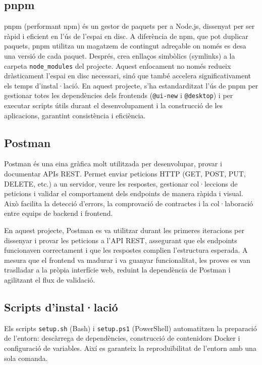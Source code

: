 \subsection*{pnpm}
pnpm (performant npm) és un gestor de paquets per a Node.js, dissenyat per ser ràpid i eficient en l'ús de l'espai en disc. A diferència de npm, que pot duplicar paquets, pnpm utilitza un magatzem de contingut adreçable on només es desa una versió de cada paquet. Després, crea enllaços simbòlics (symlinks) a la carpeta \texttt{node\_modules} del projecte. Aquest enfocament no només redueix dràsticament l'espai en disc necessari, sinó que també accelera significativament els temps d'instal·lació. En aquest projecte, s'ha estandarditzat l'ús de pnpm per gestionar totes les dependències dels frontends (\texttt{@ui-new} i \texttt{@desktop}) i per executar scripts útils durant el desenvolupament i la construcció de les aplicacions, garantint consistència i eficiència.

\subsection*{Postman}
Postman és una eina gràfica molt utilitzada per desenvolupar, provar i documentar APIs REST. Permet enviar peticions HTTP (GET, POST, PUT, DELETE, etc.) a un servidor, veure les respostes, gestionar col·leccions de peticions i validar el comportament dels endpoints de manera ràpida i visual. Això facilita la detecció d'errors, la comprovació de contractes i la col·laboració entre equips de backend i frontend.

En aquest projecte, Postman es va utilitzar durant les primeres iteracions per dissenyar i provar les peticions a l'API REST, assegurant que els endpoints funcionaven correctament i que les respostes complien l'estructura esperada. A mesura que el frontend va madurar i va guanyar funcionalitat, les proves es van traslladar a la pròpia interfície web, reduint la dependència de Postman i agilitzant el flux de validació.

\subsection*{Scripts d'instal·lació}
Els scripts \texttt{setup.sh} (Bash) i \texttt{setup.ps1} (PowerShell) automatitzen la preparació de l'entorn: descàrrega de dependències, construcció de contenidors Docker i configuració de variables. Així es garanteix la reproduïbilitat de l'entorn amb una sola comanda.

